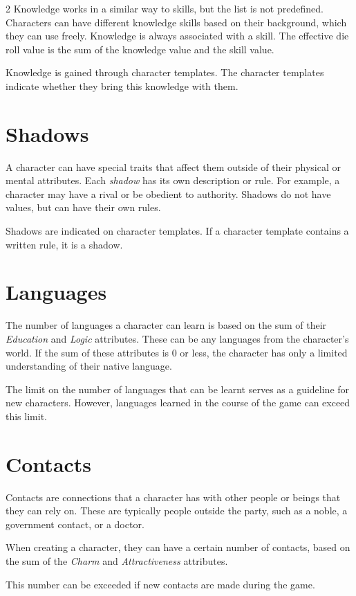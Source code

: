 \begin{multicols}{2}
Knowledge works in a similar way to skills, but the list is not predefined. Characters can have different knowledge skills based on their background, which they can use freely. Knowledge is always associated with a skill. The effective die roll value is the sum of the knowledge value and the skill value.

Knowledge is gained through character templates. The character templates indicate whether they bring this knowledge with them.

\section{Shadows}

A character can have special traits that affect them outside of their physical or mental attributes. Each \textit{shadow} has its own description or rule. For example, a character may have a rival or be obedient to authority. Shadows do not have values, but can have their own rules.

Shadows are indicated on character templates. If a character template contains a written rule, it is a shadow.

\section{Languages}

The number of languages a character can learn is based on the sum of their \textit{Education} and \textit{Logic} attributes. These can be any languages from the character's world. If the sum of these attributes is 0 or less, the character has only a limited understanding of their native language.

The limit on the number of languages that can be learnt serves as a guideline for new characters. However, languages learned in the course of the game can exceed this limit.


\section{Contacts}

Contacts are connections that a character has with other people or beings that they can rely on. These are typically people outside the party, such as a noble, a government contact, or a doctor.

When creating a character, they can have a certain number of contacts, based on the sum of the \textit{Charm} and \textit{Attractiveness} attributes.

This number can be exceeded if new contacts are made during the game.
\end{multicols}
